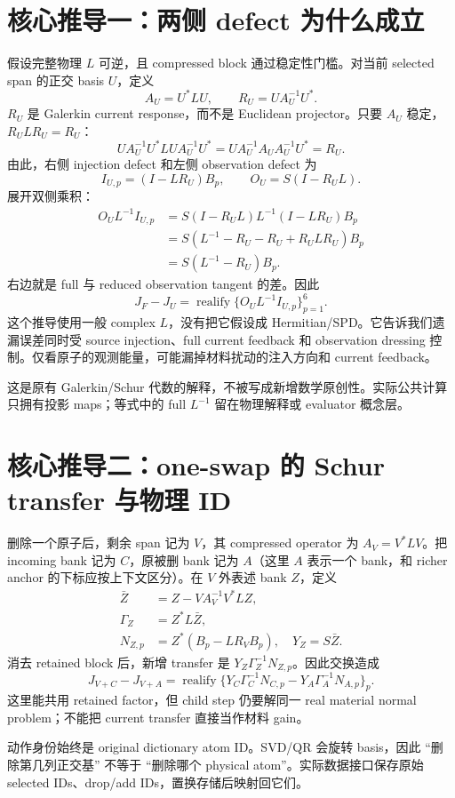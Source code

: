 \documentclass[UTF8,11pt,a4paper,fontset=fandol]{ctexart}
\newcommand{\op}[1]{\operatorname{#1}}
\begin{document}
\section{核心推导一：两侧 defect 为什么成立}
假设完整物理 $L$ 可逆，且 compressed block 通过稳定性门槛。对当前 selected span 的正交 basis $U$，定义
\[
 A_U=U^*LU,\qquad R_U=UA_U^{-1}U^*.
\]
$R_U$ 是 Galerkin current response，而不是 Euclidean projector。只要 $A_U$ 稳定，$R_ULR_U=R_U$：
\[
 UA_U^{-1}U^*LU A_U^{-1}U^*=UA_U^{-1}A_UA_U^{-1}U^*=R_U.
\]
由此，右侧 injection defect 和左侧 observation defect 为
\[
 I_{U,p}=(I-LR_U)B_p,\qquad O_U=S(I-R_UL).
\]
展开双侧乘积：
\begin{align*}
 O_UL^{-1}I_{U,p}
 &=S(I-R_UL)L^{-1}(I-LR_U)B_p\\
 &=S(L^{-1}-R_U-R_U+R_ULR_U)B_p\\
 &=S(L^{-1}-R_U)B_p.
\end{align*}
右边就是 full 与 reduced observation tangent 的差。因此
\[
 J_F-J_U=\op{realify}\{O_UL^{-1}I_{U,p}\}_{p=1}^6.
\]
这个推导使用一般 complex $L$，没有把它假设成 Hermitian/SPD。它告诉我们遗漏误差同时受 source injection、full current feedback 和 observation dressing 控制。仅看原子的观测能量，可能漏掉材料扰动的注入方向和 current feedback。

这是原有 Galerkin/Schur 代数的解释，不被写成新增数学原创性。实际公共计算只拥有投影 maps；等式中的 full $L^{-1}$ 留在物理解释或 evaluator 概念层。

\section{核心推导二：one-swap 的 Schur transfer 与物理 ID}
删除一个原子后，剩余 span 记为 $V$，其 compressed operator 为 $A_V=V^*LV$。把 incoming bank 记为 $C$，原被删 bank 记为 $A$（这里 $A$ 表示一个 bank，和 richer anchor 的下标应按上下文区分）。在 $V$ 外表述 bank $Z$，定义
\begin{align*}
 \bar Z&=Z-VA_V^{-1}V^*LZ,\\
 \Gamma_Z&=Z^*L\bar Z,\\
 N_{Z,p}&=Z^*(B_p-LR_VB_p),\quad Y_Z=S\bar Z.
\end{align*}
消去 retained block 后，新增 transfer 是 $Y_Z\Gamma_Z^{-1}N_{Z,p}$。因此交换造成
\[
 J_{V+C}-J_{V+A}=\op{realify}\{Y_C\Gamma_C^{-1}N_{C,p}-Y_A\Gamma_A^{-1}N_{A,p}\}_p.
\]
这里能共用 retained factor，但 child step 仍要解同一 real material normal problem；不能把 current transfer 直接当作材料 gain。

动作身份始终是 original dictionary atom ID。SVD/QR 会旋转 basis，因此 ``删除第几列正交基'' 不等于 ``删除哪个 physical atom''。实际数据接口保存原始 selected IDs、drop/add IDs，置换存储后映射回它们。
\end{document}
